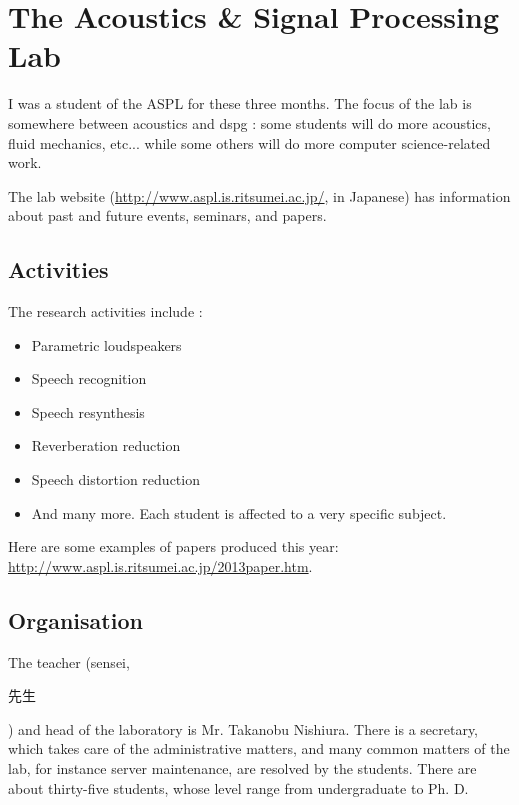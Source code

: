 \section{The Acoustics \& Signal Processing Lab}
I was a student of the \ac{ASPL} for these three months. The focus of the lab is somewhere between acoustics and \ac{dspg} : some students will do more acoustics, fluid mechanics, etc...  while some others will do more computer science-related work.

The lab website (\url{http://www.aspl.is.ritsumei.ac.jp/}, in Japanese) has information about past and future events, seminars, and papers. 
\subsection{Activities}
The research activities include :
\begin{itemize}
\item Parametric loudspeakers
\item Speech recognition
\item Speech resynthesis
\item Reverberation reduction
\item Speech distortion reduction
\item And many more. Each student is affected to a very specific subject.
\end{itemize}

Here are some examples of papers produced this year: \url{http://www.aspl.is.ritsumei.ac.jp/2013paper.htm}.

\subsection{Organisation}
The teacher (sensei, \begin{CJK}{UTF8}{min}先生\end{CJK}) and head of the laboratory is Mr. Takanobu Nishiura. There is a secretary, which takes care of the administrative matters, and many common matters of the lab, for instance server maintenance, are resolved by the students.
There are about thirty-five students, whose level range from undergraduate to Ph. D.